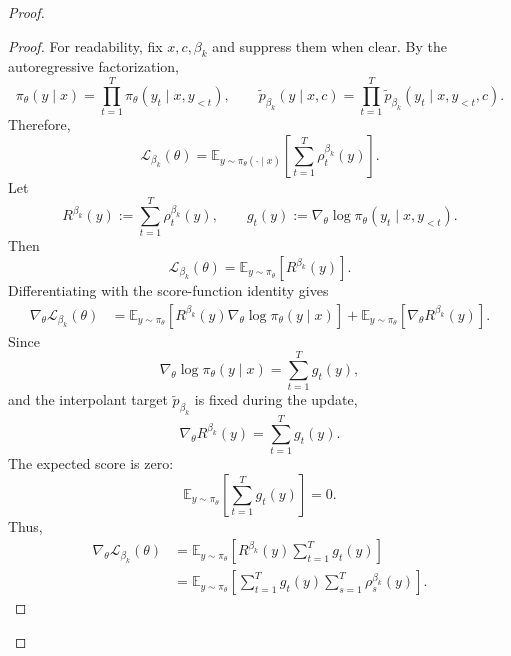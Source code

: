 \begin{proof}
\begin{proof}
For readability, fix $x,c,\beta_k$ and suppress them when clear. By the autoregressive
factorization,
\begin{equation}
    \pi_\theta(y\mid x)
    =
    \prod_{t=1}^{T}
    \pi_\theta(y_t\mid x,y_{<t}),
    \qquad
    \tilde p_{\beta_k}(y\mid x,c)
    =
    \prod_{t=1}^{T}
    \tilde p_{\beta_k}(y_t\mid x,y_{<t},c).
\end{equation}
Therefore,
\begin{equation}
    \mathcal{L}_{\beta_k}(\theta)
    =
    \mathbb{E}_{y\sim\pi_\theta(\cdot\mid x)}
    \left[
    \sum_{t=1}^{T}
    \rho_t^{\beta_k}(y)
    \right].
\end{equation}
Let
\begin{equation}
    R^{\beta_k}(y)
    :=
    \sum_{t=1}^{T}
    \rho_t^{\beta_k}(y),
    \qquad
    g_t(y)
    :=
    \nabla_\theta
    \log \pi_\theta(y_t\mid x,y_{<t}).
\end{equation}
Then
\begin{equation}
    \mathcal{L}_{\beta_k}(\theta)
    =
    \mathbb{E}_{y\sim\pi_\theta}
    \left[
    R^{\beta_k}(y)
    \right].
\end{equation}
Differentiating with the score-function identity gives
\begin{align}
    \nabla_\theta \mathcal{L}_{\beta_k}(\theta)
    &=
    \mathbb{E}_{y\sim\pi_\theta}
    \left[
    R^{\beta_k}(y)
    \nabla_\theta \log \pi_\theta(y\mid x)
    \right]
    +
    \mathbb{E}_{y\sim\pi_\theta}
    \left[
    \nabla_\theta R^{\beta_k}(y)
    \right].
\end{align}
Since
\begin{equation}
    \nabla_\theta \log \pi_\theta(y\mid x)
    =
    \sum_{t=1}^{T}
    g_t(y),
\end{equation}
and the interpolant target $\tilde p_{\beta_k}$ is fixed during the update,
\begin{equation}
    \nabla_\theta R^{\beta_k}(y)
    =
    \sum_{t=1}^{T}
    g_t(y).
\end{equation}
The expected score is zero:
\begin{equation}
    \mathbb{E}_{y\sim\pi_\theta}
    \left[
    \sum_{t=1}^{T}
    g_t(y)
    \right]
    =
    0.
\end{equation}
Thus,
\begin{align}
    \nabla_\theta \mathcal{L}_{\beta_k}(\theta)
    &=
    \mathbb{E}_{y\sim\pi_\theta}
    \left[
    R^{\beta_k}(y)
    \sum_{t=1}^{T}
    g_t(y)
    \right] \\
    &=
    \mathbb{E}_{y\sim\pi_\theta}
    \left[
    \sum_{t=1}^{T}
    g_t(y)
    \sum_{s=1}^{T}
    \rho_s^{\beta_k}(y)
    \right].
    \label{eq:full_return_gradient_beta}
\end{align}


\end{proof}
\end{proof}
